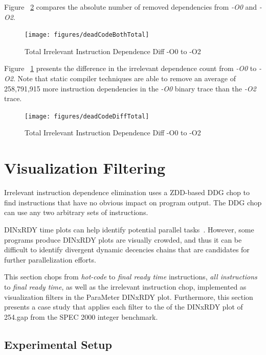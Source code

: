\documentclass[defaultstyle,11pt]{thesis}
\begin{document}
Figure ~\ref{fig:totalDeadBoth} compares the absolute number of
removed dependencies from \textit{-O0} and \textit{-O2}. 

\begin{figure}
  \centering
  \texttt{[image: figures/deadCodeBothTotal]}
  \caption{Total Irrelevant Instruction Dependence Diff -O0 to -O2}
  \label{fig:totalDeadDiff}
\end{figure}

Figure ~\ref{fig:totalDeadDiff} presents the difference in the
irrelevant dependence count from \textit{-O0} to \textit{-O2}. Note
that static compiler techniques are able to remove an average of
258,791,915 more instruction dependencies in the \textit{-O0} binary
trace than the \textit{-O2} trace.

\begin{figure}
  \centering
  \texttt{[image: figures/deadCodeDiffTotal]}
  \caption{Total Irrelevant Instruction Dependence Diff -O0 to -O2}
  \label{fig:totalDeadBoth}
\end{figure}

\section{Visualization Filtering}
\label{sec:visualfilter}

Irrelevant instruction dependence elimination uses a ZDD-based DDG
chop to find instructions that have no obvious impact on program
output.  The DDG chop can use any two arbitrary sets of instructions.

DINxRDY time plots can help identify potential parallel
tasks~\cite{price:08:pact}.  However, some programs produce DINxRDY
plots are visually crowded, and thus it can be difficult to identify
divergent dynamic decencies chains that are candidates for further
parallelization efforts.

This section chops from \textit{hot-code} to \textit{final ready time}
instructions, \textit{all instructions} to \textit{final ready time},
as well as the irrelevant instruction chop, implemented as
visualization filters in the ParaMeter DINxRDY plot. Furthermore, this
section presents a case study that applies each filter to the of the
DINxRDY plot of 254.gap from the SPEC 2000 integer benchmark.

\subsection {Experimental Setup}
\end{document}
